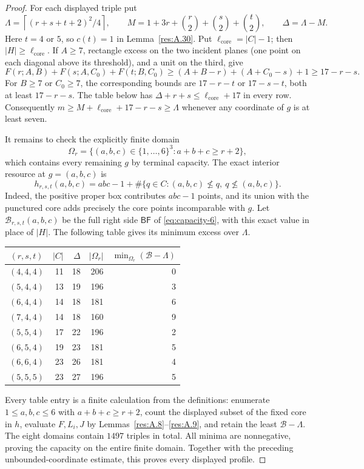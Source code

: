 \documentclass[11pt]{article}
\theoremstyle{definition}
\theoremstyle{remark}
\theoremstyle{plain}
\begin{document}
\begin{proof}
For each displayed triple put
\[
 \Lambda=\left\lceil(r+s+t+2)^2/4\right\rceil,\qquad
 M=1+3r+\binom r2+\binom s2+\binom t2,\qquad \Delta=\Lambda-M.
\]
Here $t=4$ or $5$, so $c(t)=1$ in Lemma~\ref{res:A.30}.  Put $\ell_{\mathrm{core}}=|C|-1$;
then $|H|\ge \ell_{\mathrm{core}}$.
If $A\ge7$, rectangle excess on the two incident planes (one point
on each diagonal above its threshold), and a unit on the third, give
\[
 F(r;A,B)+F(s;A,C_0)+F(t;B,C_0)
 \ge(A+B-r)+(A+C_0-s)+1\ge17-r-s.
\]
For $B\ge7$ or $C_0\ge7$, the corresponding bounds are
$17-r-t$ or $17-s-t$, both at least $17-r-s$.
The table below has $\Delta+r+s\le \ell_{\mathrm{core}}+17$ in every row.
Consequently $m\ge M+\ell_{\mathrm{core}}+17-r-s\ge \Lambda$ whenever any coordinate of $g$
is at least seven.

It remains to check the explicitly finite domain
\[
 \Omega_r=\{(a,b,c)\in\{1,\ldots,6\}^3:a+b+c\ge r+2\},
\]
which contains every remaining $g$ by terminal capacity.
The exact interior resource at $g=(a,b,c)$ is
\[
 h_{r,s,t}(a,b,c)
 =abc-1+\#\{q\in C:(a,b,c)\nleq q,\ q\nleq(a,b,c)\}.
\]
Indeed, the positive proper box contributes $abc-1$ points, and its
union with the punctured core adds precisely the core points
incomparable with $g$.  Let $\mathcal B_{r,s,t}(a,b,c)$ be the full
right side $\mathsf{BF}$ of \eqref{eq:capacity-6}, with this exact value in place of
$|H|$.  The following table gives its minimum excess over $\Lambda$.

\begin{center}
\begin{tabular}{c|r|r|r|r}
 $(r,s,t)$&$|C|$&$\Delta$&$|\Omega_r|$
    &$\min_{\Omega_r}(\mathcal B-\Lambda)$\\\hline
 $(4,4,4)$&11&18&206&0\\
 $(5,4,4)$&13&19&196&3\\
 $(6,4,4)$&14&18&181&6\\
 $(7,4,4)$&14&18&160&9\\
 $(5,5,4)$&17&22&196&2\\
 $(6,5,4)$&19&23&181&5\\
 $(6,6,4)$&23&26&181&4\\
 $(5,5,5)$&23&27&196&5
\end{tabular}
\end{center}
\hypertarget{tab:capacity-eight-profiles}{}

Every table entry is a finite calculation from the definitions:
enumerate $1\le a,b,c\le6$ with $a+b+c\ge r+2$, count the displayed
subset of the fixed core in $h$, evaluate $F,L_i,J$ by Lemmas~\ref{res:A.8}--\ref{res:A.9},
and retain the least $\mathcal B-\Lambda$.
The eight domains contain $1497$ triples in total.
All minima are nonnegative, proving the capacity on the entire finite
domain.  Together with the preceding unbounded-coordinate estimate,
this proves every displayed profile. \end{proof}
\end{document}
